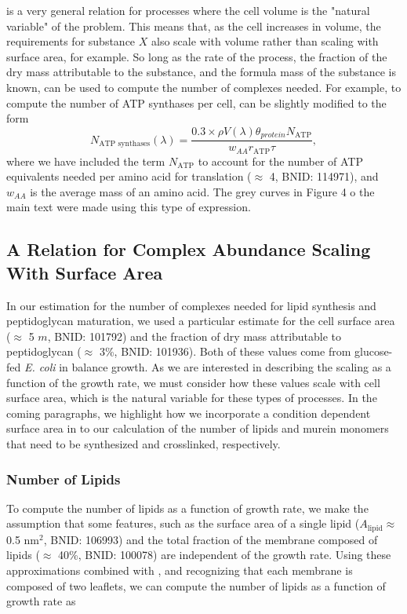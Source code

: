  is a very general relation for processes where the
cell volume is the "natural variable" of the problem. This means that, as the
cell increases in volume, the requirements for substance $X$ also scale with
volume rather than scaling with surface area, for example. So long as the rate
of the process, the fraction of the dry mass attributable to the substance, and
the formula mass of the substance is known,  can be
used to compute the number of complexes needed. For example, to compute the
number of ATP synthases per cell,  can be slightly
modified to the form
\begin{equation}
    N_\text{ATP synthases}(\lambda) = \frac{0.3 \times \rho V(\lambda)\theta_{protein}N_\text{ATP}}{w_{AA} r_\text{ATP} \tau},
\end{equation}
where we have included the term $N_\text{ATP}$ to account for the number of ATP
equivalents needed per amino acid for translation ($\approx$ 4, BNID: 114971),
and $w_{AA}$ is the average mass of an amino acid. The grey curves in Figure 4
o the main text were made using this type of expression.

\subsection{A Relation for Complex Abundance Scaling With Surface Area}
In our estimation for the number of complexes needed for lipid synthesis and
peptidoglycan maturation, we used a particular estimate for the cell surface
area ($\approx$ 5 \textmu$m$, BNID: 101792) and the fraction of dry mass
attributable to peptidoglycan ($\approx$ 3\%, BNID: 101936). Both of these
values come from glucose-fed \textit{E. coli} in balance growth. As we are
interested in describing the scaling as a function of the growth rate, we must
consider how these values scale with cell surface area, which is the natural
variable for these types of processes. In the coming paragraphs, we highlight
how we incorporate a condition dependent surface area in to our calculation of
the number of lipids and murein monomers that need to be synthesized and
crosslinked, respectively.

\subsubsection{Number of Lipids}
To compute the number of lipids as a function of growth rate, we make the
assumption that some features, such as the surface area of a single lipid
($A_\text{lipid} \approx$ 0.5 nm$^2$, BNID: 106993) and the total fraction of the membrane
composed of lipids ($\approx$ 40\%, BNID: 100078) are independent of the growth
rate. Using these approximations combined with , and
recognizing that each membrane is composed of two leaflets, we can
compute the number of lipids as a function of growth rate as

